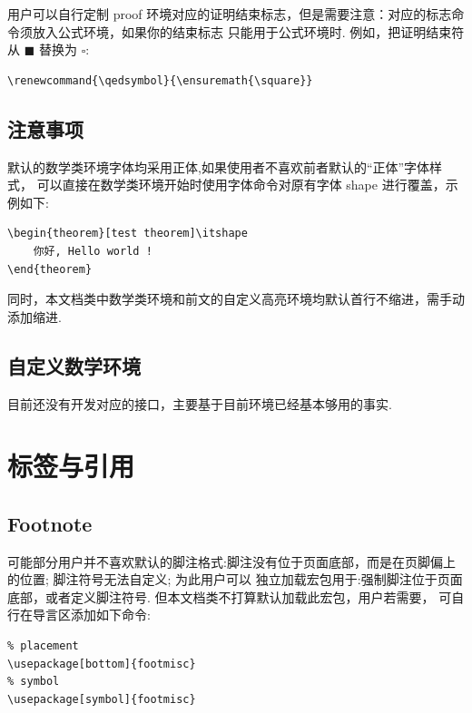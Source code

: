 用户可以自行定制 proof 环境对应的证明结束标志，但是需要注意：对应的标志命令须放入公式环境，如果你的结束标志
只能用于公式环境时. 例如，把证明结束符从 \(\blacksquare\) 替换为 $\square$:
\begin{verbatim}
\renewcommand{\qedsymbol}{\ensuremath{\square}}
\end{verbatim}


\subsection{注意事项}
默认的数学类环境字体均采用正体\cmd[F]{\upshape},如果使用者不喜欢前者默认的``正体''字体样式，
可以直接在数学类环境开始时使用字体命令\cmd[F]{\itshape}对原有字体 shape 进行覆盖，示例如下:

\begin{verbatim}
\begin{theorem}[test theorem]\itshape
    你好, Hello world !
\end{theorem}
\end{verbatim}

\begin{remark}\itshape
    \boomen \par 
    \boomcn
\end{remark}

同时，本文档类中数学类环境和前文的自定义高亮环境\cmd{\zlatexFramed}均默认首行不缩进，需手动添加缩进.

\subsection{自定义数学环境}
目前还没有开发对应的接口，主要基于目前环境已经基本够用的事实.


\section{标签与引用}\label{标签与引用}
\subsection{Footnote}
可能部分用户并不喜欢默认的脚注格式:脚注没有位于页面底部，而是在页脚偏上的位置; 脚注符号无法自定义; 为此用户可以
独立加载宏包用于:强制脚注位于页面底部，或者定义脚注符号. 但本文档类不打算默认加载此宏包，用户若需要，
可自行在导言区添加如下命令:

\begin{verbatim}
% placement
\usepackage[bottom]{footmisc}
% symbol 
\usepackage[symbol]{footmisc}
\end{verbatim}

